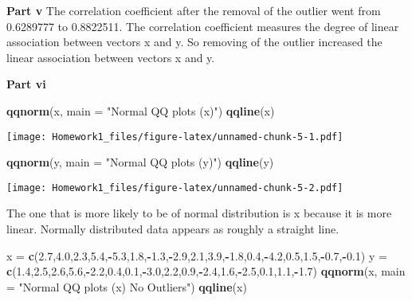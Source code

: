 \documentclass[
]{article}
\newenvironment{Shaded}{\begin{snugshade}}{\end{snugshade}}
\newcommand{\AttributeTok}[1]{\textcolor[rgb]{0.13,0.29,0.53}{#1}}
\newcommand{\FloatTok}[1]{\textcolor[rgb]{0.00,0.00,0.81}{#1}}
\newcommand{\FunctionTok}[1]{\textcolor[rgb]{0.13,0.29,0.53}{\textbf{#1}}}
\newcommand{\NormalTok}[1]{#1}
\newcommand{\OtherTok}[1]{\textcolor[rgb]{0.56,0.35,0.01}{#1}}
\newcommand{\SpecialCharTok}[1]{\textcolor[rgb]{0.81,0.36,0.00}{\textbf{#1}}}
\newcommand{\StringTok}[1]{\textcolor[rgb]{0.31,0.60,0.02}{#1}}
\begin{document}
\textbf{Part v} The correlation coefficient after the removal of the
outlier went from 0.6289777 to 0.8822511. The correlation coefficient
measures the degree of linear association between vectors x and y. So
removing of the outlier increased the linear association between vectors
x and y.

\textbf{Part vi}

\begin{Shaded}
\begin{Highlighting}[]
\FunctionTok{qqnorm}\NormalTok{(x, }\AttributeTok{main =} \StringTok{"Normal QQ plots (x)"}\NormalTok{)}
\FunctionTok{qqline}\NormalTok{(x)}
\end{Highlighting}
\end{Shaded}

\texttt{[image: Homework1\_files/figure-latex/unnamed-chunk-5-1.pdf]}

\begin{Shaded}
\begin{Highlighting}[]
\FunctionTok{qqnorm}\NormalTok{(y, }\AttributeTok{main =} \StringTok{"Normal QQ plots (y)"}\NormalTok{)}
\FunctionTok{qqline}\NormalTok{(y)}
\end{Highlighting}
\end{Shaded}

\texttt{[image: Homework1\_files/figure-latex/unnamed-chunk-5-2.pdf]}

The one that is more likely to be of normal distribution is x because it
is more linear. Normally distributed data appears as roughly a straight
line.

\begin{Shaded}
\begin{Highlighting}[]
\NormalTok{x }\OtherTok{=} \FunctionTok{c}\NormalTok{(}\FloatTok{2.7}\NormalTok{,}\FloatTok{4.0}\NormalTok{,}\FloatTok{2.3}\NormalTok{,}\FloatTok{5.4}\NormalTok{,}\SpecialCharTok{{-}}\FloatTok{5.3}\NormalTok{,}\FloatTok{1.8}\NormalTok{,}\SpecialCharTok{{-}}\FloatTok{1.3}\NormalTok{,}\SpecialCharTok{{-}}\FloatTok{2.9}\NormalTok{,}\FloatTok{2.1}\NormalTok{,}\FloatTok{3.9}\NormalTok{,}\SpecialCharTok{{-}}\FloatTok{1.8}\NormalTok{,}\FloatTok{0.4}\NormalTok{,}\SpecialCharTok{{-}}\FloatTok{4.2}\NormalTok{,}\FloatTok{0.5}\NormalTok{,}\FloatTok{1.5}\NormalTok{,}\SpecialCharTok{{-}}\FloatTok{0.7}\NormalTok{,}\SpecialCharTok{{-}}\FloatTok{0.1}\NormalTok{)}
\NormalTok{y }\OtherTok{=} \FunctionTok{c}\NormalTok{(}\FloatTok{1.4}\NormalTok{,}\FloatTok{2.5}\NormalTok{,}\FloatTok{2.6}\NormalTok{,}\FloatTok{5.6}\NormalTok{,}\SpecialCharTok{{-}}\FloatTok{2.2}\NormalTok{,}\FloatTok{0.4}\NormalTok{,}\FloatTok{0.1}\NormalTok{,}\SpecialCharTok{{-}}\FloatTok{3.0}\NormalTok{,}\FloatTok{2.2}\NormalTok{,}\FloatTok{0.9}\NormalTok{,}\SpecialCharTok{{-}}\FloatTok{2.4}\NormalTok{,}\FloatTok{1.6}\NormalTok{,}\SpecialCharTok{{-}}\FloatTok{2.5}\NormalTok{,}\FloatTok{0.1}\NormalTok{,}\FloatTok{1.1}\NormalTok{,}\SpecialCharTok{{-}}\FloatTok{1.7}\NormalTok{)}
\FunctionTok{qqnorm}\NormalTok{(x, }\AttributeTok{main =} \StringTok{"Normal QQ plots (x) No Outliers"}\NormalTok{)}
\FunctionTok{qqline}\NormalTok{(x)}
\end{Highlighting}
\end{Shaded}
\end{document}
